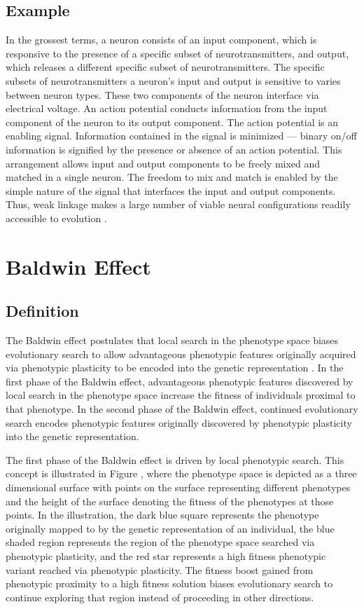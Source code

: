 \subsection{Example}
In the grossest terms, a neuron consists of an input component, which is responsive to the presence of a specific subset of neurotransmitters, and output, which releases a different specific subset of neurotransmitters.
The specific subsets of neurotransmitters a neuron's input and output is sensitive to varies between neuron types.
These two components of the neuron interface via electrical voltage.
An action potential conducts information from the input component of the neuron to its output component.
The action potential is an enabling signal.
Information contained in the signal is minimized --- binary on/off information is signified by the presence or absence of an action potential.
This arrangement allows input and output components to be freely mixed and matched in a single neuron.
The freedom to mix and match is enabled by the simple nature of the signal that interfaces the input and output components.
Thus, weak linkage makes a large number of viable neural configurations readily accessible to evolution \cite[p 139]{Kirschner2005TheDilemma}.

\section{Baldwin Effect}

\subsection{Definition}
The Baldwin effect postulates that local search in the phenotype space biases evolutionary search to allow advantageous phenotypic features originally acquired via phenotypic plasticity to be encoded into the genetic representation \cite{Downing2010TheNetworks}.
In the first phase of the Baldwin effect, advantageous phenotypic features discovered by local search in the phenotype space increase the fitness of individuals proximal to that phenotype.
In the second phase of the Baldwin effect, continued evolutionary search encodes phenotypic features originally discovered by phenotypic plasticity into the genetic representation.

The first phase of the Baldwin effect is driven by local phenotypic search.
This concept is illustrated in Figure , where the phenotype space is depicted as a three dimensional surface with points on the surface representing different phenotypes and the height of the surface denoting the fitness of the phenotypes at those points.
In the illustration, the dark blue square represents the phenotype originally mapped to by the genetic representation of an individual, the blue shaded region represents the region of the phenotype space searched via phenotypic plasticity, and the red star represents a high fitness phenotypic variant reached via phenotypic plasticity. 
The fitness boost gained from phenotypic proximity to a high fitness solution biases evolutionary search to continue exploring that region instead of proceeding in other directions.

